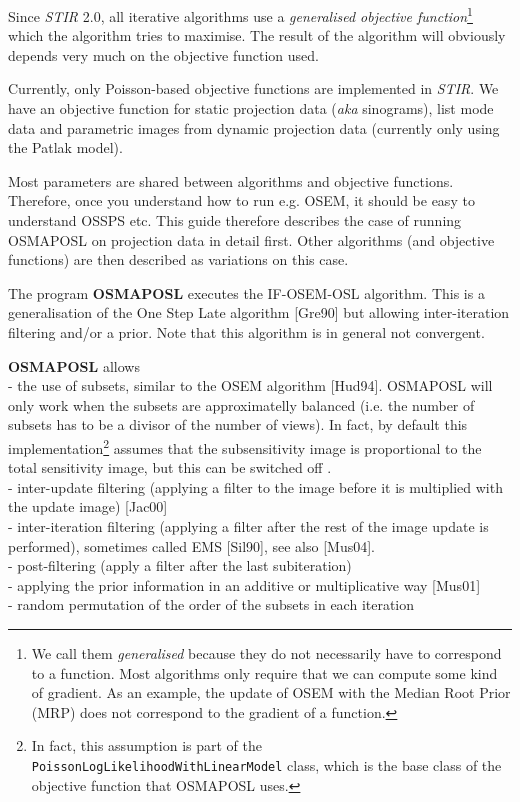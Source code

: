 \documentclass{article}
\newcommand{\tab}{\hspace{5mm}}
\begin{document}
Since \textit{STIR} 2.0, all iterative algorithms use a \textit{generalised objective 
function}\footnote{We call them \textit{generalised} because they do not
necessarily have to correspond to a function. Most algorithms only require
that we can compute some kind of gradient. As an example, the update
of OSEM with the Median Root Prior (MRP) does not correspond to the
gradient of a function.} which the algorithm tries to maximise. The result
of the algorithm will obviously depends very much on the objective function
used.

Currently, only Poisson-based objective functions are implemented in \textit{STIR}. We
have an objective function for static projection data (\textit{aka} sinograms),
list mode data and parametric images from dynamic projection data 
(currently only using the Patlak model).

Most parameters are shared between algorithms and objective functions. Therefore,
once you understand how to run e.g. OSEM, it should be easy to understand OSSPS etc.
This guide therefore describes the case of running OSMAPOSL on projection data in detail
first. Other algorithms (and objective functions) are then described as variations on this
case.

{ 
}
\label{sec:OSMAPOSL}

The program \textbf{OSMAPOSL} executes the IF-OSEM-OSL algorithm. 
This is a generalisation of the One Step Late algorithm [Gre90] but allowing
inter-iteration filtering and/or a prior. Note that this 
algorithm is in general not convergent.

\textbf{OSMAPOSL} 
allows \\
-\tab 
the use of subsets, similar to the OSEM algorithm [Hud94]. OSMAPOSL
will only work when the subsets are approximatelly balanced (i.e.
the number of subsets has to be a divisor of the number of views).
In fact, by default this implementation\footnote{In fact, this assumption
is part of the \texttt{PoissonLogLikelihoodWithLinearModel} class, which is
the base class of the objective function that OSMAPOSL uses.} assumes that the 
subsensitivity image is proportional to the total sensitivity image,
but this can be switched off .\\
-\tab 
inter-update filtering (applying a filter to the image before 
it is multiplied with the update image) [Jac00]\\
-\tab 
inter-iteration filtering (applying a filter after the rest of 
the image update is performed), sometimes called EMS [Sil90], 
see also [Mus04].\\
-\tab 
post-filtering (apply a filter after the last subiteration)\\
-\tab 
applying the prior information in an additive or multiplicative 
way [Mus01]\\
-\tab 
random permutation of the order of the subsets in each iteration
\end{document}
